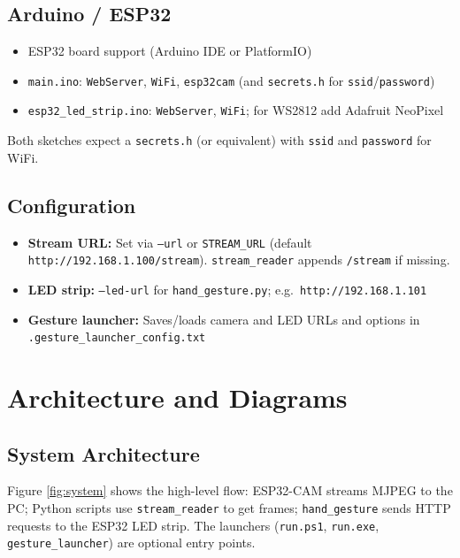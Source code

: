 \documentclass[a4paper,12pt]{article}
\begin{document}
\subsection{Arduino / ESP32}
\begin{itemize}
    \item ESP32 board support (Arduino IDE or PlatformIO)
    \item \texttt{main.ino}: \texttt{WebServer}, \texttt{WiFi}, \texttt{esp32cam} (and \texttt{secrets.h} for \texttt{ssid}/\texttt{password})
    \item \texttt{esp32\_led\_strip.ino}: \texttt{WebServer}, \texttt{WiFi}; for WS2812 add Adafruit NeoPixel
\end{itemize}
Both sketches expect a \texttt{secrets.h} (or equivalent) with \texttt{ssid} and \texttt{password} for WiFi.

\subsection{Configuration}
\begin{itemize}
    \item \textbf{Stream URL:} Set via \texttt{--url} or \texttt{STREAM\_URL} (default \texttt{http://192.168.1.100/stream}). \texttt{stream\_reader} appends \texttt{/stream} if missing.
    \item \textbf{LED strip:} \texttt{--led-url} for \texttt{hand\_gesture.py}; e.g.\ \texttt{http://192.168.1.101}
    \item \textbf{Gesture launcher:} Saves/loads camera and LED URLs and options in \texttt{.gesture\_launcher\_config.txt}
\end{itemize}

\section{Architecture and Diagrams}

\subsection{System Architecture}
Figure \ref{fig:system} shows the high-level flow: ESP32-CAM streams MJPEG to the PC; Python scripts use \texttt{stream\_reader} to get frames; \texttt{hand\_gesture} sends HTTP requests to the ESP32 LED strip. The launchers (\texttt{run.ps1}, \texttt{run.exe}, \texttt{gesture\_launcher}) are optional entry points.
\end{document}
